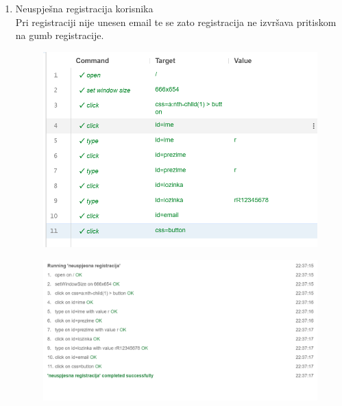 \begin{enumerate}
    \item Neuspješna registracija korisnika\\
    Pri registraciji nije unesen email te se zato registracija ne izvršava pritiskom na gumb registracije.
    \begin{figure}[H]
        \includegraphics[scale=0.30]{slike/deploy/fTest3a.png}
        \centering
        \label{fig:promjene2}
    \end{figure}
    \begin{figure}[H]
        \includegraphics[scale=0.30]{slike/deploy/fTest3b.png}
        \centering
        \label{fig:promjene1}
    \end{figure}

    \setcounter{enumi}{3}


\end{enumerate}
